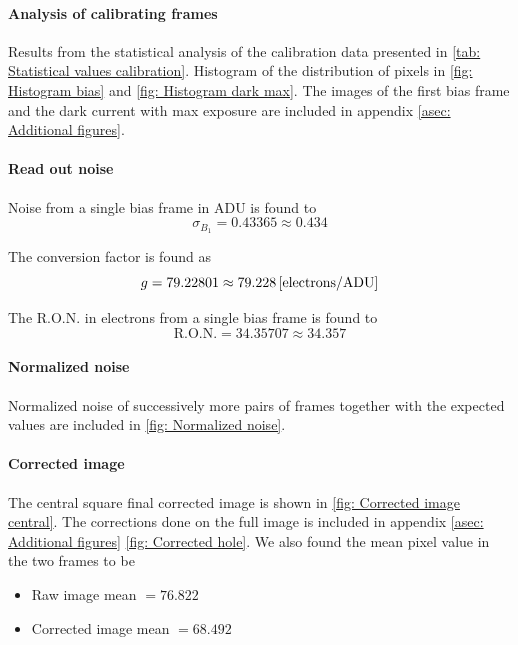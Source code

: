 \documentclass{emulateapj}
\begin{document}
\paragraph{Analysis of calibrating frames}
Results from the statistical analysis of the calibration data presented in \cref{tab: Statistical values calibration}. Histogram of the distribution of pixels in \cref{fig: Histogram bias} and \cref{fig: Histogram dark max}. The images of the first bias frame and the dark current with max exposure are included in appendix \ref{asec: Additional figures}.

\paragraph{Read out noise}
Noise from a single bias frame in ADU is found to
\begin{equation}
	\sigma_{B_1} = 0.43365 \approx 0.434
\end{equation}

The conversion factor is found as
\begin{equation}
	g = 79.22801 \approx 79.228\, \qty[\text{electrons/ADU}]
\end{equation}

The R.O.N. in electrons from a single bias frame is found to
\begin{equation}
	\text{R.O.N.}  = 34.35707 \approx 34.357
\end{equation}

\paragraph{Normalized noise}
Normalized noise of successively more pairs of frames together with the expected values are included in \cref{fig: Normalized noise}.

\paragraph{Corrected image}
The central square final corrected image is shown in \cref{fig: Corrected image central}. The corrections done on the full image is included in appendix \ref{asec: Additional figures} \cref{fig: Corrected hole}. We also found the mean pixel value in the two frames to be
\begin{itemize}
	\item Raw image mean $=76.822$
	\item Corrected image mean $=68.492$ 
\end{itemize}
\end{document}
